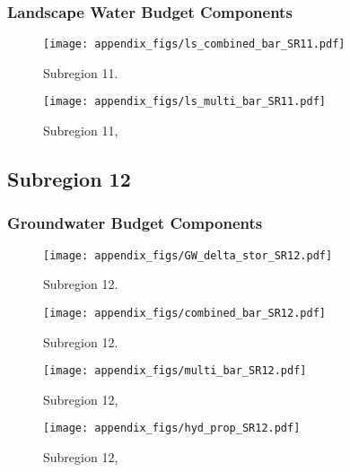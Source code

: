 \subsubsection{Landscape Water Budget Components}
\begin{figure}[ht]
\centerline{\texttt{[image: appendix\_figs/ls\_combined\_bar\_SR11.pdf]}}
\caption{\LSCombinedTextOne Subregion 11.\LSCombinedTextTwo}
\label{fig:LS_budget_SR11}
\end{figure}
\newpage

\begin{landscape}
\begin{figure}[ht]
\centerline{\texttt{[image: appendix\_figs/ls\_multi\_bar\_SR11.pdf]}}
\caption{\LSMultiTextOne Subregion 11,\LSMultiTextTwo}
\label{fig:multi_LS_budget_SR11}
\end{figure}
\newpage
\end{landscape}

\subsection{Subregion 12}
\subsubsection{Groundwater Budget Components}
\begin{figure}[h]
\centerline{\texttt{[image: appendix\_figs/GW\_delta\_stor\_SR12.pdf]}}
\caption{\GWBudgetText Subregion 12.}
\label{fig:delta_stor_SR12}
\end{figure}
\newpage

\begin{figure}[ht]
\centerline{\texttt{[image: appendix\_figs/combined\_bar\_SR12.pdf]}}
\caption{\GWCombinedTextOne Subregion 12.\GWCombinedTextTwo}
\label{fig:GW_budget_SR12}
\end{figure}
\newpage

\begin{landscape}
\begin{figure}[ht]
\centerline{\texttt{[image: appendix\_figs/multi\_bar\_SR12.pdf]}}
\caption{\GWMultiTextOne Subregion 12,\GWMultiTextTwo}
\label{fig:multi_GW_budget_SR12}
\end{figure}
\newpage

\begin{figure}[ht]
\centerline{\texttt{[image: appendix\_figs/hyd\_prop\_SR12.pdf]}}
\caption{\HydPropOne Subregion 12,\HydPropTwo}
\label{fig:hyd_prop_SR12}
\end{figure}
\newpage
\end{landscape}

